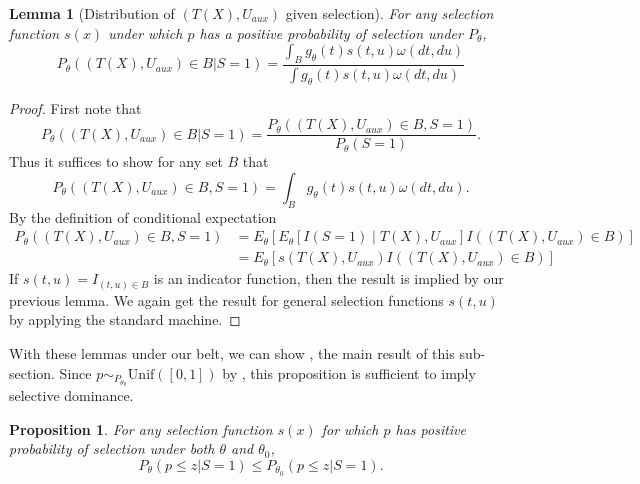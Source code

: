 \documentclass{article}
\newtheorem{lemma}{Lemma}
\newtheorem{proposition}{Proposition}
\begin{document}
\begin{appendix}
\begin{lemma}[Distribution of $(T(X), U_{aux})$ given selection]
    For any selection function $s(x)$ under which $p$ has a positive probability of selection under $P_{\theta}$, 
    \begin{equation*}
        P_{\theta}((T(X), U_{aux}) \in B| S = 1 ) = \frac{\int_{B} g_{\theta}(t)s(t, u) \omega(dt, du)}{ \int g_{\theta}(t) s(t, u) \omega(dt, du) }
    \end{equation*}
\end{lemma}

\begin{proof} First note that
    \begin{equation*}
        P_{\theta}( (T(X), U_{aux}) \in B | S= 1 ) = \frac{P_{\theta}((T(X), U_{aux}) \in B, S = 1) }{P_{\theta}(S = 1)}.
    \end{equation*} 
    Thus it suffices to show for any set $B$ that 
    \begin{equation*}
        P_{\theta}( (T(X), U_{aux}) \in B,  S= 1 ) = \int_B g_{\theta}(t) s(t, u) \omega(dt, du). 
    \end{equation*} 
    By the definition of conditional expectation
    \begin{align*}
        P_{\theta}( (T(X), U_{aux}) \in B,  S= 1 ) &= E_{\theta}[E_{\theta}[ I(S=1) \mid  T(X), U_{aux}] I((T(X), U_{aux}) \in B) ]\\
                                                   &= E_{\theta}[ s(T(X), U_{aux}) I((T(X), U_{aux}) \in B) ]
    \end{align*}
    If $s(t, u) = I_{(t, u) \in B}$ is an indicator function, then the result is implied by our previous lemma. We again get the result for general selection functions $s(t, u)$ by applying the standard machine. 
\end{proof}


With these lemmas under our belt, we can show , the main result of this sub-section. Since $p \sim_{P_{\theta_0}} \text{Unif}([0, 1])$ by , this proposition is sufficient to imply selective dominance. 

\begin{proposition}
    \label{prop:mlr_sel_dom}
    For any selection function $s(x)$ for which $p$ has positive probability of selection under both $\theta$ and $\theta_0$,  
    \begin{equation*}
        P_{\theta}(p \leq z | S = 1)  \leq P_{\theta_0}(p \leq z | S = 1).
    \end{equation*}
\end{proposition}


\end{appendix}
\end{document}
